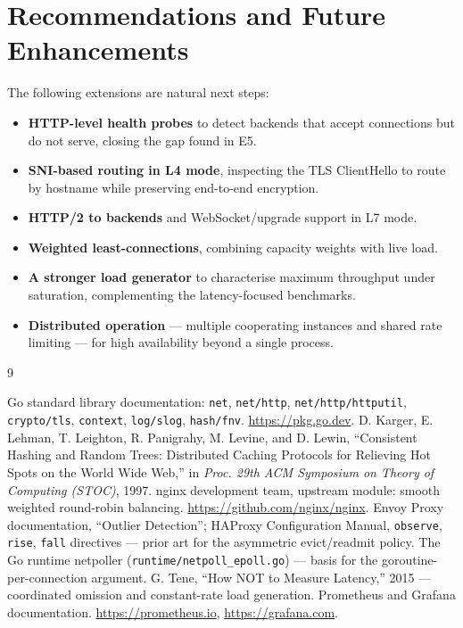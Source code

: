\documentclass[11pt,a4paper]{report}
\newcommand{\code}[1]{\texttt{#1}}
\begin{document}
\section{Recommendations and Future Enhancements}
The following extensions are natural next steps:
\begin{itemize}
  \item \textbf{HTTP-level health probes} to detect backends that accept connections but do not
  serve, closing the gap found in E5.
  \item \textbf{SNI-based routing in L4 mode}, inspecting the TLS ClientHello to route by hostname
  while preserving end-to-end encryption.
  \item \textbf{HTTP/2 to backends} and WebSocket/upgrade support in L7 mode.
  \item \textbf{Weighted least-connections}, combining capacity weights with live load.
  \item \textbf{A stronger load generator} to characterise maximum throughput under saturation,
  complementing the latency-focused benchmarks.
  \item \textbf{Distributed operation} --- multiple cooperating instances and shared rate limiting
  --- for high availability beyond a single process.
\end{itemize}

\begin{thebibliography}{9}
 Go standard library documentation: \code{net}, \code{net/http},
\code{net/http/httputil}, \code{crypto/tls}, \code{context}, \code{log/slog}, \code{hash/fnv}.
\url{https://pkg.go.dev}.
 D. Karger, E. Lehman, T. Leighton, R. Panigrahy, M. Levine, and D. Lewin,
``Consistent Hashing and Random Trees: Distributed Caching Protocols for Relieving Hot Spots on
the World Wide Web,'' in \emph{Proc. 29th ACM Symposium on Theory of Computing (STOC)}, 1997.
 nginx development team, upstream module: smooth weighted round-robin balancing.
\url{https://github.com/nginx/nginx}.
 Envoy Proxy documentation, ``Outlier Detection''; HAProxy Configuration Manual,
\code{observe}, \code{rise}, \code{fall} directives --- prior art for the asymmetric evict/readmit
policy.
 The Go runtime netpoller (\code{runtime/netpoll\_epoll.go}) --- basis for the
goroutine-per-connection argument.
 G. Tene, ``How NOT to Measure Latency,'' 2015 --- coordinated omission and
constant-rate load generation.
 Prometheus and Grafana documentation. \url{https://prometheus.io},
\url{https://grafana.com}.
\end{thebibliography}
\end{document}
